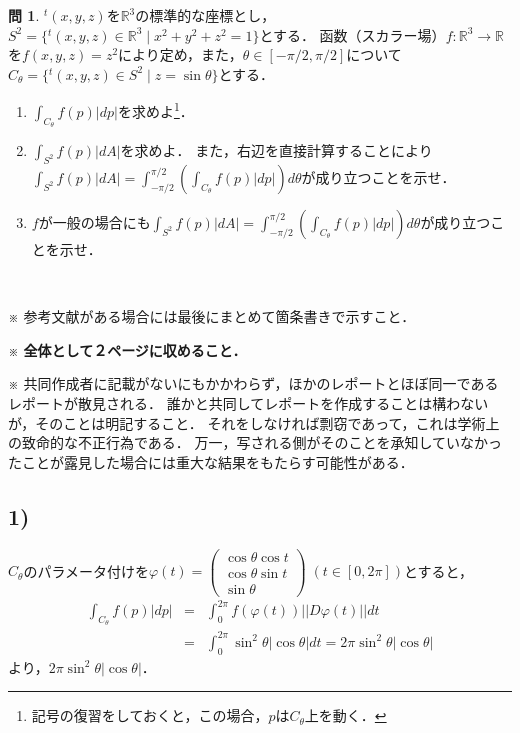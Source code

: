 \documentclass[dvipdfmx,nosetpagesize, uplatex]{jsarticle}
\newcommand\R{\mathbb{R}}
\theoremstyle{definition}
\newtheorem*{question*}{問}
\theoremstyle{StatementsWithStar}
\theoremstyle{StatementsWithStar2}
\theoremstyle{StatementsWithStar3}
\theoremstyle{StatementsWithCCirc}
\theoremstyle{definition}
\begin{document}
\noindent
\begin{question*}
${}^t(x,y,z)$を$\R^3$の標準的な座標とし，$S^2=\{{}^t(x,y,z)\in\R^3\mid x^2+y^2+z^2=1\}$とする．
函数（スカラー場）$f\colon\R^3\to\R$を$f(x,y,z)=z^2$により定め，また，$\theta\in[-\pi/2,\pi/2]$について$C_\theta=\{{}^t(x,y,z)\in S^2\mid z=\sin\theta\}$とする．
\begin{enumerate}
\item
$\int_{C_\theta}f(p)\lvert dp\rvert$を求めよ\footnote{記号の復習をしておくと，この場合，$p$は$C_\theta$上を動く．}．
\item
$\int_{S^2}f(p)\lvert dA\rvert$を求めよ．
また，右辺を直接計算することにより$\int_{S^2}f(p)\lvert dA\rvert=\int_{-\pi/2}^{\pi/2}\left(\int_{C_\theta}f(p)\lvert dp\rvert\right)d\theta$が成り立つことを示せ．
\item
$f$が一般の場合にも$\int_{S^2}f(p)\lvert dA\rvert=\int_{-\pi/2}^{\pi/2}\left(\int_{C_\theta}f(p)\lvert dp\rvert\right)d\theta$が成り立つことを示せ．
\end{enumerate}
\end{question*}
\par
\ \par
\noindent
{\small
※ 参考文献がある場合には最後にまとめて箇条書きで示すこと．\par\noindent
※ \textbf{全体として２ページに収めること．}\par\noindent
※ 共同作成者に記載がないにもかかわらず，ほかのレポートとほぼ同一であるレポートが散見される．
誰かと共同してレポートを作成することは構わないが，そのことは明記すること．
それをしなければ剽窃であって，これは学術上の致命的な不正行為である．
万一，写される側がそのことを承知していなかったことが露見した場合には重大な結果をもたらす可能性がある．
}

\par
%
%
\noindent

\subsection*{1)}

$C_\theta$のパラメータ付けを$\varphi(t)=\left(\begin{array}{c}\cos\theta\cos t \\ \cos\theta\sin t \\ \sin\theta\end{array}\right)\; (t\in [0,2\pi])$とすると，
\begin{eqnarray*}
    \int_{C_\theta}f(p)|dp| &=& \int^{2\pi}_0f(\varphi(t))||D\varphi(t)||dt \\
    &=& \int^{2\pi}_0\sin^2\theta |\cos\theta|dt = 2\pi\sin^2\theta|\cos\theta|
\end{eqnarray*}
より，$2\pi\sin^2\theta|\cos\theta|$．
\end{document}
